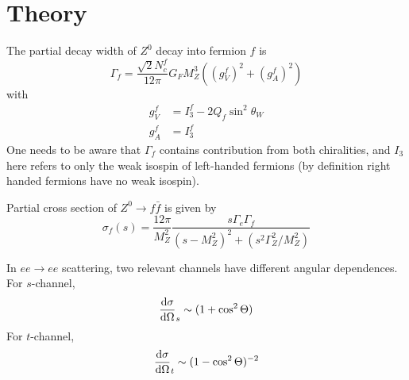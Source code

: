 \section{Theory}
The partial decay width of $Z^0$ decay into fermion $f$ is
\begin{equation}
	\Gamma_f = \frac{ \sqrt{2} N_c^f}{12\pi} G_F M_Z^3 \left( (g_V^f)^2 + (g_A^f)^2  \right)
	\label{math:Gammaf}
\end{equation}
with
\begin{align*}
	g_V^f &= I_3^f - 2 Q_f \sin^2 \theta_W \\
	g_A^f &= I_3^f 
\end{align*}
One needs to be aware that $\Gamma_f$ contains contribution from both chiralities, and $I_3$ here refers to only the weak isospin of left-handed fermions (by definition right handed fermions have no weak isospin).

Partial cross section of $Z^0 \rightarrow f\bar{f}$ is given by~\cite{manual}
\begin{equation}
	\sigma_f(s) = \frac{12 \pi}{M_Z^2} \frac{s \Gamma_e \Gamma_f}{ (s-M_Z^2)^2 + (s^2 \Gamma^2_Z / M_Z^2)}
\end{equation}

In $ee \rightarrow ee$ scattering, two relevant channels have different angular dependences. For $s$-channel,
\begin{equation}
	\dv{\sigma}{\Omega}_s \sim (1 + \cos^2 \Theta)
	\label{math:diffCrossS}
\end{equation}
For $t$-channel,
\begin{equation}
	\dv{\sigma}{\Omega}_t \sim (1-\cos^2 \Theta)^{-2}
	\label{math:diffCrossT}
\end{equation}
